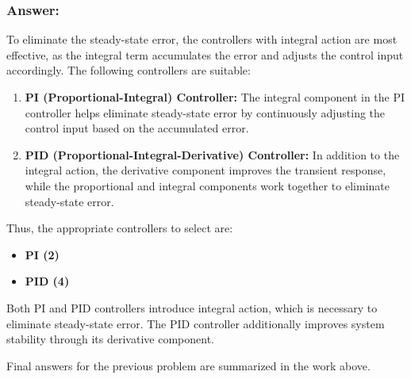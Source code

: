 \documentclass[12pt]{article}
\begin{document}
\subsubsection*{Answer:}
To eliminate the steady-state error, the controllers with integral action are most effective, as the integral term accumulates the error and adjusts the control input accordingly. The following controllers are suitable:

\begin{enumerate}
    \item \textbf{PI (Proportional-Integral) Controller:} The integral component in the PI controller helps eliminate steady-state error by continuously adjusting the control input based on the accumulated error.
    
    \item \textbf{PID (Proportional-Integral-Derivative) Controller:} In addition to the integral action, the derivative component improves the transient response, while the proportional and integral components work together to eliminate steady-state error.
\end{enumerate}

\noindent
Thus, the appropriate controllers to select are:
\begin{itemize}
    \item \textbf{PI (2)}
    \item \textbf{PID (4)}
\end{itemize}

\noindent
Both PI and PID controllers introduce integral action, which is necessary to eliminate steady-state error. The PID controller additionally improves system stability through its derivative component.



\begin{resultsbox}
Final answers for the previous problem are summarized in the work above.
\end{resultsbox}
\end{document}
